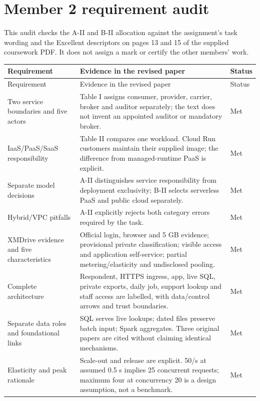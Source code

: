 \documentclass[a4paper,11pt]{article}
\begin{document}
\section*{Member 2 requirement audit}
This audit checks the A-II and B-II allocation against the assignment's task wording
and the Excellent descriptors on pages 13 and 15 of the supplied coursework PDF.
It does not assign a mark or certify the other members' work.

\small
\begin{longtable}{@{}p{.27\linewidth}p{.59\linewidth}p{.08\linewidth}@{}}
\toprule Requirement & Evidence in the revised paper & Status \\
\midrule
\endfirsthead
\toprule Requirement & Evidence in the revised paper & Status \\
\midrule
\endhead
Two service boundaries and five actors & Table I assigns consumer, provider, carrier, broker and auditor separately; the text does not invent an appointed auditor or mandatory broker. & Met \\
IaaS/PaaS/SaaS responsibility & Table II compares one workload. Cloud Run customers maintain their supplied image; the difference from managed-runtime PaaS is explicit. & Met \\
Separate model decisions & A-II distinguishes service responsibility from deployment exclusivity; B-II selects serverless PaaS and public cloud separately. & Met \\
Hybrid/VPC pitfalls & A-II explicitly rejects both category errors required by the task. & Met \\
XMDrive evidence and five characteristics & Official login, browser and 5 GB evidence; provisional private classification; visible access and application self-service; partial metering/elasticity and undisclosed pooling. & Met \\
Complete architecture & Respondent, HTTPS ingress, app, live SQL, private exports, daily job, support lookup and staff access are labelled, with data/control arrows and trust boundaries. & Met \\
Separate data roles and foundational links & SQL serves live lookups; dated files preserve batch input; Spark aggregates. Three original papers are cited without claiming identical mechanisms. & Met \\
Elasticity and peak rationale & Scale-out and release are explicit. 50/s at assumed 0.5 s implies 25 concurrent requests; maximum four at concurrency 20 is a design assumption, not a benchmark. & Met \\

\end{longtable}
\end{document}

